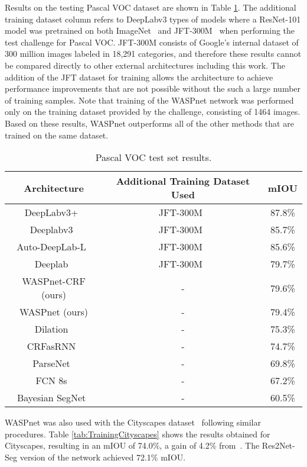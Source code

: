 \documentclass[sensors,article,accept,moreauthors,pdftex]{Definitions/mdpi}
\begin{document}
Results on the testing Pascal VOC dataset are shown in Table \ref{tab:TestingVOC}.
The additional training dataset column refers to DeepLabv3 types of models where a ResNet-101 model was pretrained on both ImageNet~\cite{ImageNet} and JFT-300M~\cite{Revisiting} when performing the test challenge for Pascal VOC.
JFT-300M consists of Google's internal dataset of 300 million images labeled in 18,291 categories, and therefore these results cannot be compared directly to other external architectures including this work. The addition of the JFT dataset for training allows the architecture to achieve performance improvements that are not possible without the such a large number of training samples.
Note that training of the WASPnet network was performed only on the training dataset provided by the challenge, consisting of 1464 images.
Based on these results, WASPnet outperforms all of the other methods that are trained on the same dataset.


\begin{table}[H]
\caption{Pascal VOC test set results.}
\centering
\begin{tabular}{ccc}
\toprule
\textbf{Architecture}&\textbf{Additional Training Dataset Used}&\textbf{mIOU}\\

\midrule
DeepLabv3+~\cite{DeepLabv3+}&JFT-300M~\cite{Revisiting}&87.8\%\\
Deeplabv3~\cite{Rethinking}&JFT-300M~\cite{Revisiting}&85.7\%\\
Auto-DeepLab-L~\cite{Auto-DeepLab}&JFT-300M~\cite{Revisiting}&85.6\%\\
Deeplab~\cite{DeepLab}&JFT-300M~\cite{Revisiting}&79.7\%\\
\midrule
WASPnet-CRF (ours)&-&79.6\%\\
WASPnet (ours)&-&79.4\%\\
Dilation~\cite{DilatedConv}&-&75.3\%\\
CRFasRNN~\cite{CRFasRNN}&-&74.7\%\\
ParseNet~\cite{Parsenet}&-&69.8\%\\
FCN 8s~\cite{FCN}&-&67.2\%\\
Bayesian SegNet~\cite{Bayesian-SegNet}&-&60.5\%\\
\bottomrule
\end{tabular}
\label{tab:TestingVOC}
\end{table}

WASPnet was also used with the Cityscapes dataset~\cite{Cityscapes} following similar procedures. Table \ref{tab:TrainingCityscapes} shows the results obtained for Cityscapes, resulting in an mIOU of 74.0\%, a gain of 4.2\% from~\cite{DeepLab}.
The Res2Net-Seg version of the network achieved 72.1\% mIOU.
\end{document}

